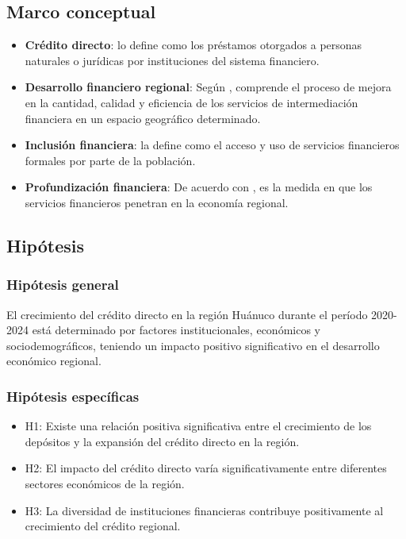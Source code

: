 \documentclass[12pt, a4paper]{article}
\begin{document}
\subsection{Marco conceptual}

\begin{itemize}
    \item \textbf{Crédito directo}: \textcite{BCRP2024} lo define como los préstamos otorgados a personas naturales o jurídicas por instituciones del sistema financiero.
    
    \item \textbf{Desarrollo financiero regional}: Según \textcite{Kumar2023}, comprende el proceso de mejora en la cantidad, calidad y eficiencia de los servicios de intermediación financiera en un espacio geográfico determinado.
    
    \item \textbf{Inclusión financiera}: \textcite{WorldBank2023} la define como el acceso y uso de servicios financieros formales por parte de la población.
    
    \item \textbf{Profundización financiera}: De acuerdo con \textcite{Lopez2024}, es la medida en que los servicios financieros penetran en la economía regional.
\end{itemize}

\subsection{Hipótesis}

\subsubsection{Hipótesis general}
El crecimiento del crédito directo en la región Huánuco durante el período 2020-2024 está determinado por factores institucionales, económicos y sociodemográficos, teniendo un impacto positivo significativo en el desarrollo económico regional.

\subsubsection{Hipótesis específicas}
\begin{itemize}
    \item H1: Existe una relación positiva significativa entre el crecimiento de los depósitos y la expansión del crédito directo en la región.
    \item H2: El impacto del crédito directo varía significativamente entre diferentes sectores económicos de la región.
    \item H3: La diversidad de instituciones financieras contribuye positivamente al crecimiento del crédito regional.
\end{itemize}
\end{document}
